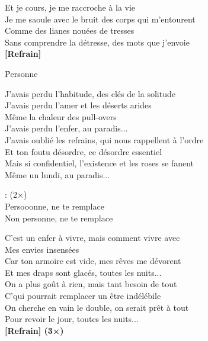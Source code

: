 \documentclass{novel}
\begin{document}
{{\begin{minipage}[t][0.5\textheight][t]{\textwidth}
\begin{multicols}{2}
Et je cours, je me raccroche à la vie\\
Je me saoule avec le bruit des corps qui m'entourent\\
Comme des lianes nouées de tresses\\
Sans comprendre la détresse, des mots que j'envoie\\

\textbf{[Refrain]}

\end{multicols}
\end{minipage}

\nointerlineskip
\begin{minipage}[b][0.55\textheight][t]{\textwidth}
\vspace{0.15\textheight}
\h*{Personne}

\begin{multicols}{2}
J'avais perdu l'habitude, des clés de la solitude\\
J'avais perdu l'amer et les déserts arides\\
Même la chaleur des pull-overs\\
J'avais perdu l'enfer, au paradis...\\

J'avais oublié les refrains, qui nous rappellent à l'ordre\\
Et ton foutu désordre, ce désordre essentiel\\
Mais si confidentiel, l'existence et les roses se fanent\\
Même un lundi, au paradis...\\

\begin{bfseries}
[Refrain]: (2×)\\
Persooonne, ne te remplace\\
Non personne, ne te remplace\\
\end{bfseries}
\columnbreak

C'est un enfer à vivre, mais comment vivre avec\\
Mes envies insensées\\
Car ton armoire est vide, mes rêves me dévorent\\
Et mes draps sont glacés, toutes les nuits...\\

On a plus goût à rien, mais tant besoin de tout\\
C'qui pourrait remplacer un être indélébile\\
On cherche en vain le double, on serait prêt à tout\\
Pour revoir le jour, toutes les nuits...\\

\textbf{[Refrain] (3×)}

\end{multicols}
\end{minipage}
}
}
\end{document}
